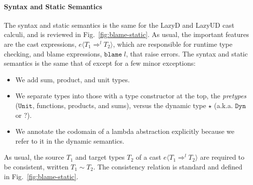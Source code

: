 \documentclass[acmsmall,review,anonymous]{acmart}\settopmatter{printfolios=true,printccs=false,printacmref=false}
\newcommand{\figref}[1]{Fig.~\ref{#1}}
\newcommand{\lazyUD}{Lazy\;UD}
\newcommand{\lazyD}{Lazy\;D}
\newcommand{\POOunit}[0]{\mathtt{Unit}}
\newcommand{\eOOcast}[4]{#1 \langle \cOOcast{#2}{#3}{#4} \rangle}
\newcommand{\eOOblame}[1]{\mathtt{blame} \; #1}
\newcommand{\cOOcast}[3]{#1 \Rightarrow^{#2} #3}
\begin{document}
\paragraph{Syntax and Static Semantics}

The syntax and static semantics is the same for the \lazyD{} and
\lazyUD{} cast calculi, and is reviewed in \figref{fig:blame-static}.
As usual, the important features are the cast expressions,
$\eOOcast{e}{T_1}{l}{T_2}$, which are responsible for runtime type
checking, and blame expressions, $\eOOblame{l}$, that raise errors.
The syntax and static semantics is the same that of
\citet{siek2009exploring} except for a few minor exceptions:
\begin{itemize}
\item We add sum, product, and unit types.
\item We separate types into those with a type constructor at the top,
  the \emph{pretypes} ($\POOunit$, functions, products, and sums),
  versus the dynamic type $\star$ (a.k.a. $\mathtt{Dyn}$ or
  $\mathbb{?}$).
\item We annotate the codomain of a lambda abstraction explicitly
  because we refer to it in the dynamic semantics. 
\end{itemize}
As usual, the source $T_1$ and target types $T_2$ of a cast
$\eOOcast{e}{T_1}{l}{T_2}$ are required to be consistent, written $T_1
\sim T_2$. The consistency relation is standard and defined in
\figref{fig:blame-static}.



\end{document}
